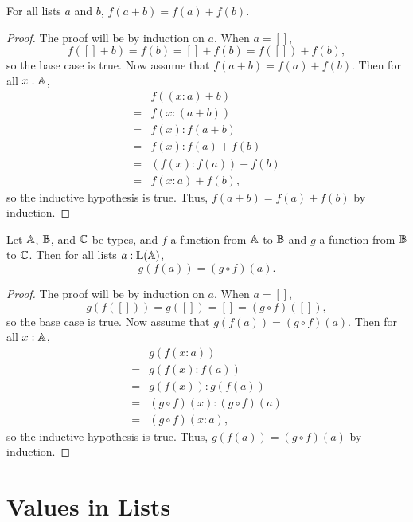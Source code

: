 \documentclass[../../math.tex]{subfiles}
\begin{document}
\begin{theorem}
    For all lists $a$ and $b$, $f(a + b) = f(a) + f(b)$.
\end{theorem}
\begin{proof}
    The proof will be by induction on $a$.  When $a = []$,
    \[
        f([] + b) = f(b) = [] + f(b) = f([]) + f(b),
    \]
    so the base case is true.  Now assume that $f(a + b) = f(a) + f(b)$.
    Then for all $x : \mathbb{A}$,
    \begin{align*}
           & f((x : a) + b) \\
        ={}& f(x : (a + b)) \\
        ={}& f(x) : f(a + b) \\
        ={}& f(x) : f(a) + f(b) \\
        ={}& (f(x) : f(a)) + f(b) \\
        ={}& f(x : a) + f(b),
    \end{align*}
    so the inductive hypothesis is true.  Thus, $f(a + b) = f(a) + f(b)$
    by induction.
\end{proof}

\begin{theorem} \label{list_image_comp}
    Let $\mathbb{A}$, $\mathbb{B}$, and $\mathbb{C}$ be types, and $f$ a function from $\mathbb{A}$ to $\mathbb{B}$ and
    $g$ a function from $\mathbb{B}$ to $\mathbb{C}$.  Then for all lists $a : \mathbb{L}(\mathbb{A})$,
    \[
        g(f(a)) = (g \circ f)(a).
    \]
\end{theorem}
\begin{proof}
    The proof will be by induction on $a$.  When $a = []$,
    \[
        g(f([])) = g([]) = [] = (g \circ f)([]),
    \]
    so the base case is true.  Now assume that $g(f(a)) = (g \circ f)(a)$.  Then
    for all $x : \mathbb{A}$,
    \begin{align*}
           & g(f(x : a)) \\
        ={}& g(f(x) : f(a)) \\
        ={}& g(f(x)) : g(f(a)) \\
        ={}& (g \circ f)(x) : (g \circ f)(a) \\
        ={}& (g \circ f)(x : a),
    \end{align*}
    so the inductive hypothesis is true.  Thus, $g(f(a)) = (g \circ f)(a)$ by
    induction.
\end{proof}

\section{Values in Lists}
\end{document}
